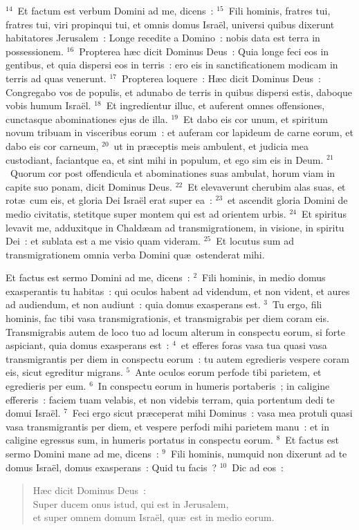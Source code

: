 ${}^{14}$~Et factum est verbum Domini ad me, dicens~:
${}^{15}$~Fili hominis, fratres tui, fratres tui, viri propinqui tui, et omnis domus Isra\"el, universi quibus dixerunt habitatores Jerusalem~: Longe recedite a Domino~: nobis data est terra in possessionem.
${}^{16}$~Propterea h\ae c dicit Dominus Deus~: Quia longe feci eos in gentibus, et quia dispersi eos in terris~: ero eis in sanctificationem modicam in terris ad quas venerunt.
${}^{17}$~Propterea loquere~: H\ae c dicit Dominus Deus~: Congregabo vos de populis, et adunabo de terris in quibus dispersi estis, daboque vobis humum Isra\"el.
${}^{18}$~Et ingredientur illuc, et auferent omnes offensiones, cunctasque abominationes ejus de illa.
${}^{19}$~Et dabo eis cor unum, et spiritum novum tribuam in visceribus eorum~: et auferam cor lapideum de carne eorum, et dabo eis cor carneum,
${}^{20}$~ut in pr\ae ceptis meis ambulent, et judicia mea custodiant, faciantque ea, et sint mihi in populum, et ego sim eis in Deum.
${}^{21}$~Quorum cor post offendicula et abominationes suas ambulat, horum viam in capite suo ponam, dicit Dominus Deus.
${}^{22}$~Et elevaverunt cherubim alas suas, et rot\ae\ cum eis, et gloria Dei Isra\"el erat super ea~:
${}^{23}$~et ascendit gloria Domini de medio civitatis, stetitque super montem qui est ad orientem urbis.
${}^{24}$~Et spiritus levavit me, adduxitque in Chald\ae am ad transmigrationem, in visione, in spiritu Dei~: et sublata est a me visio quam videram.
${}^{25}$~Et locutus sum ad transmigrationem omnia verba Domini qu\ae\ ostenderat mihi.

\bchapter
\lettrine[lines=3,image=true,loversize=0.05,lraise=-0.03]{E}{}t factus est sermo Domini ad me, dicens~:
${}^{2}$~Fili hominis, in medio domus exasperantis tu habitas~: qui oculos habent ad videndum, et non vident, et aures ad audiendum, et non audiunt~: quia domus exasperans est.
${}^{3}$~Tu ergo, fili hominis, fac tibi vasa transmigrationis, et transmigrabis per diem coram eis. Transmigrabis autem de loco tuo ad locum alterum in conspectu eorum, si forte aspiciant, quia domus exasperans est~:
${}^{4}$~et efferes foras vasa tua quasi vasa transmigrantis per diem in conspectu eorum~: tu autem egredieris vespere coram eis, sicut egreditur migrans.
${}^{5}$~Ante oculos eorum perfode tibi parietem, et egredieris per eum.
${}^{6}$~In conspectu eorum in humeris portaberis~; in caligine effereris~: faciem tuam velabis, et non videbis terram, quia portentum dedi te domui Isra\"el.
${}^{7}$~Feci ergo sicut pr\ae ceperat mihi Dominus~: vasa mea protuli quasi vasa transmigrantis per diem, et vespere perfodi mihi parietem manu~: et in caligine egressus sum, in humeris portatus in conspectu eorum.
${}^{8}$~Et factus est sermo Domini mane ad me, dicens~:
${}^{9}$~Fili hominis, numquid non dixerunt ad te domus Isra\"el, domus exasperans~: Quid tu facis~?
${}^{10}$~Dic ad eos~: \begin{flushleft}\begin{verse}H\ae c dicit Dominus Deus~:\\ Super ducem onus istud, qui est in Jerusalem,\\ et super omnem domum Isra\"el, qu\ae\ est in medio eorum.\end{verse}\end{flushleft}



